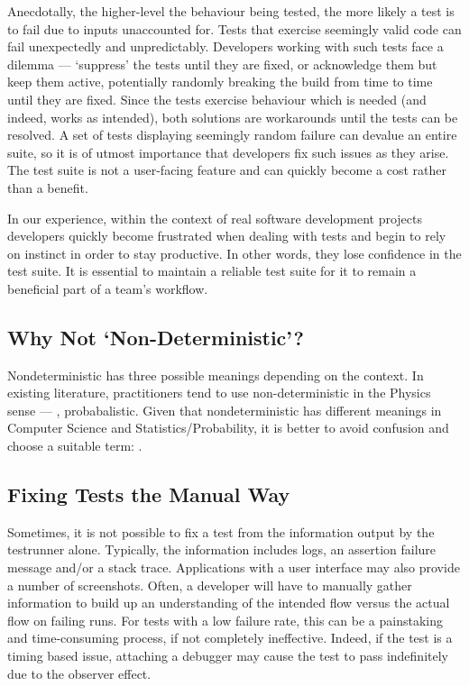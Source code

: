Anecdotally, the higher-level the behaviour being tested, the more likely a test
is to fail due to inputs unaccounted for. Tests that exercise seemingly valid
code can fail unexpectedly and unpredictably. Developers working with such tests
face a dilemma --- {\lq}suppress{\rq} the tests until they are fixed, or
acknowledge them but keep them active, potentially randomly breaking the build
from time to time until they are fixed. Since the tests exercise behaviour which
is needed (and indeed, works as intended), both solutions are workarounds until
the tests can be resolved. A set of tests displaying seemingly random failure
can devalue an entire suite, so it is of utmost importance that developers fix
such issues as they arise. The test suite is not a user-facing feature and can
quickly become a cost rather than a benefit.

In our experience, within the context of real software development projects
developers quickly become frustrated when dealing with \flaky tests and begin to
rely on instinct in order to stay productive. In other words, they lose
confidence in the test suite. It is essential to maintain a reliable test suite
for it to remain a beneficial part of a team's workflow.


\subsection{Why Not {\lq}Non-Deterministic{\rq}?}

Nondeterministic has three possible meanings depending on the context. In
existing literature, practitioners tend to use non-deterministic in the Physics
sense --- \ie, probabalistic. Given that nondeterministic has different meanings
in Computer Science and Statistics/Probability, it is better to avoid confusion
and choose a suitable term: \flaky.


\subsection{Fixing \Flaky Tests the Manual Way}

Sometimes, it is not possible to fix a \flaky test from the information output
by the testrunner alone. Typically, the information includes logs, an assertion
failure message and/or a stack trace. Applications with a user interface may
also provide a number of screenshots. Often, a developer will have to manually
gather information to build up an understanding of the intended flow versus the
actual flow on failing runs. For \flaky tests with a low failure rate, this can
be a painstaking and time-consuming process, if not completely ineffective.
Indeed, if the \flaky test is a timing based issue, attaching a debugger may
cause the test to pass indefinitely due to the observer effect.


